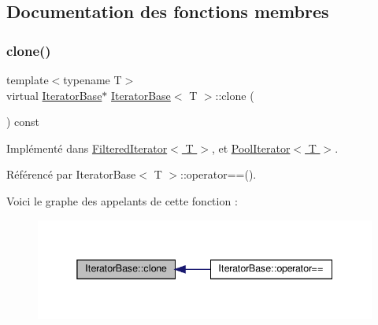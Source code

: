 \subsection{Documentation des fonctions membres}
\mbox{\label{class_iterator_base_a541fdf8cc48f31c8ddfdc3f319a37100}} 
\subsubsection{\texorpdfstring{clone()}{clone()}}
{\footnotesize\ttfamily template$<$typename T$>$ \\
virtual \hyperlink{class_iterator_base}{Iterator\+Base}$\ast$ \hyperlink{class_iterator_base}{Iterator\+Base}$<$ T $>$\+::clone (\begin{DoxyParamCaption}{ }\end{DoxyParamCaption}) const\hspace{0.3cm}{\ttfamily [pure virtual]}}



Implémenté dans \hyperlink{class_filtered_iterator_a79d512a43aa4d31caf26908e93130b9d}{Filtered\+Iterator$<$ T $>$}, et \hyperlink{class_pool_iterator_ae39cdb4bbb84e88cf0d9009e7bdae586}{Pool\+Iterator$<$ T $>$}.



Référencé par Iterator\+Base$<$ T $>$\+::operator==().

Voici le graphe des appelants de cette fonction \+:\nopagebreak
\begin{figure}[H]
\begin{center}
\leavevmode
\includegraphics[width=338pt]{class_iterator_base_a541fdf8cc48f31c8ddfdc3f319a37100_icgraph}
\end{center}
\end{figure}
\mbox{\label{class_iterator_base_a08430515a17384d098eb62ecce1b64c6}} 
